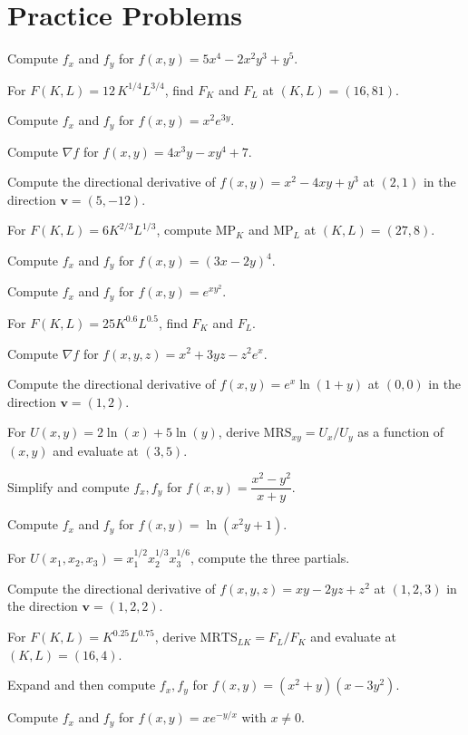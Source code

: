 \section{Practice Problems}

\begin{problems}
  \item Compute $f_x$ and $f_y$ for $f(x,y)=5x^4-2x^2y^3+y^5$.
  \item For $F(K,L)=12\,K^{1/4}L^{3/4}$, find $F_K$ and $F_L$ at
        $(K,L)=(16,81)$.
  \item Compute $f_x$ and $f_y$ for $f(x,y)=x^2e^{3y}$.
  \item Compute $\nabla f$ for $f(x,y)=4x^3y-xy^4+7$.
  \item Compute the directional derivative of $f(x,y)=x^2-4xy+y^3$ at
        $(2,1)$ in the direction $\mathbf{v}=(5,-12)$.
  \item For $F(K,L)=6K^{2/3}L^{1/3}$, compute $\mathrm{MP}_K$ and
        $\mathrm{MP}_L$ at $(K,L)=(27,8)$.
  \item Compute $f_x$ and $f_y$ for $f(x,y)=(3x-2y)^4$.
  \item Compute $f_x$ and $f_y$ for $f(x,y)=e^{xy^2}$.
  \item For $F(K,L)=25K^{0.6}L^{0.5}$, find $F_K$ and $F_L$.
  \item Compute $\nabla f$ for $f(x,y,z)=x^2+3yz-z^2e^x$.
  \item Compute the directional derivative of $f(x,y)=e^x\ln(1+y)$ at
        $(0,0)$ in the direction $\mathbf{v}=(1,2)$.
  \item For $U(x,y)=2\ln(x)+5\ln(y)$, derive $\mathrm{MRS}_{xy}=U_x/U_y$ as
        a function of $(x,y)$ and evaluate at $(3,5)$.
  \item Simplify and compute $f_x, f_y$ for
        $f(x,y)=\dfrac{x^2-y^2}{x+y}$.
  \item Compute $f_x$ and $f_y$ for $f(x,y)=\ln(x^2y+1)$.
  \item For $U(x_1,x_2,x_3)=x_1^{1/2}x_2^{1/3}x_3^{1/6}$, compute the
        three partials.
  \item Compute the directional derivative of $f(x,y,z)=xy-2yz+z^2$ at
        $(1,2,3)$ in the direction $\mathbf{v}=(1,2,2)$.
  \item For $F(K,L)=K^{0.25}L^{0.75}$, derive $\mathrm{MRTS}_{LK}=F_L/F_K$
        and evaluate at $(K,L)=(16,4)$.
  \item Expand and then compute $f_x, f_y$ for
        $f(x,y)=(x^2+y)(x-3y^2)$.
  \item Compute $f_x$ and $f_y$ for $f(x,y)=xe^{-y/x}$ with $x\neq0$.

\end{problems}
